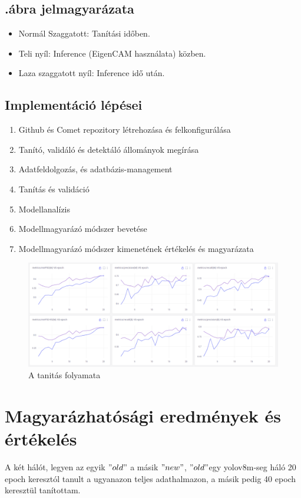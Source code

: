 \documentclass[12pt,oneside,a4paper]{article}
\newcommand{\newsection}[1]{\clearpage\section{#1}}\label{makro}
\theoremstyle{remark}
\newcommand{\oldh}{\( "old" \)}\label{makro2}
\newcommand{\newh}{\( "new" \)}
\begin{document}
\subsection{.ábra jelmagyarázata}\label{subsec:aref{fig:flowchart}-jelmagyarazata}
\begin{itemize}\label{itemize}
        \item Normál Szaggatott: Tanítási időben.
        \item Teli nyíl: Inference (EigenCAM használata) közben.\label{Inference}
        \item Laza szaggatott nyíl: Inference idő után.
    \end{itemize}
\subsection{Implementáció lépései}\label{subsec:impelemntacio}
\begin{enumerate}
        \item Github és Comet repozitory létrehozása és felkonfigurálása
        \item Tanító, validáló és detektáló állományok megírása
        \item Adatfeldolgozás, és adatbázis-management
        \item Tanítás és validáció
        \item Modellanalízis
        \item Modellmagyarázó módszer bevetése
        \item Modellmagyarázó módszer kimenetének értékelés és magyarázata
\end{enumerate}
\begin{figure}[ht]
    \centering
    \includegraphics[width=1\linewidth]{modelltanitas}
    \caption{A tanitás folyamata}
    \label{fig:tanitas}
\end{figure}

\newsection{Magyarázhatósági eredmények és értékelés}\label{sec:magyarazhatosagi-eredmenyek-es-ertekeles}
    A két hálót, legyen az egyik \oldh\label{makrohasznalat} a másik \newh, \oldh egy yolov8m-seg háló 20
    \gls{epoch} keresztól tanult a ugyanazon teljes adathalmazon, a másik pedig 40 \gls{epoch} keresztül tanítottam.
\end{document}
